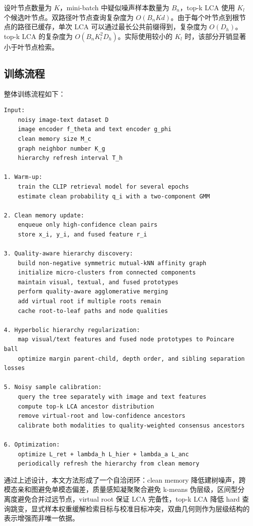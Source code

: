 设叶节点数量为 $K$，mini-batch 中疑似噪声样本数量为 $B_n$，top-k LCA 使用 $K_l$ 个候选叶节点。双路径叶节点查询复杂度为 $O(B_nKd)$。由于每个叶节点到根节点的路径已缓存，单次 LCA 可以通过最长公共前缀得到，复杂度为 $O(D_h)$。top-k LCA 的复杂度为 $O(B_nK_l^2D_h)$。实际使用较小的 $K_l$ 时，该部分开销显著小于叶节点检索。

\subsection{训练流程}

整体训练流程如下：
\begin{verbatim}
Input:
    noisy image-text dataset D
    image encoder f_theta and text encoder g_phi
    clean memory size M_c
    graph neighbor number K_g
    hierarchy refresh interval T_h

1. Warm-up:
    train the CLIP retrieval model for several epochs
    estimate clean probability q_i with a two-component GMM

2. Clean memory update:
    enqueue only high-confidence clean pairs
    store x_i, y_i, and fused feature r_i

3. Quality-aware hierarchy discovery:
    build non-negative symmetric mutual-kNN affinity graph
    initialize micro-clusters from connected components
    maintain visual, textual, and fused prototypes
    perform quality-aware agglomerative merging
    add virtual root if multiple roots remain
    cache root-to-leaf paths and node qualities

4. Hyperbolic hierarchy regularization:
    map visual/text features and fused node prototypes to Poincare ball
    optimize margin parent-child, depth order, and sibling separation losses

5. Noisy sample calibration:
    query the tree separately with image and text features
    compute top-k LCA ancestor distribution
    remove virtual-root and low-confidence ancestors
    calibrate both modalities to quality-weighted consensus ancestors

6. Optimization:
    optimize L_ret + lambda_h L_hier + lambda_a L_anc
    periodically refresh the hierarchy from clean memory
\end{verbatim}

通过上述设计，本文方法形成了一个自洽闭环：clean memory 降低建树噪声，跨模态亲和图避免单模态偏差，质量感知凝聚聚合避免 k-means 伪层级，区间型分离度避免合并过远节点，virtual root 保证 LCA 完备性，top-k LCA 降低 hard 查询跳变，显式样本权重缓解检索目标与校准目标冲突，双曲几何则作为层级结构的表示增强而非唯一依据。
